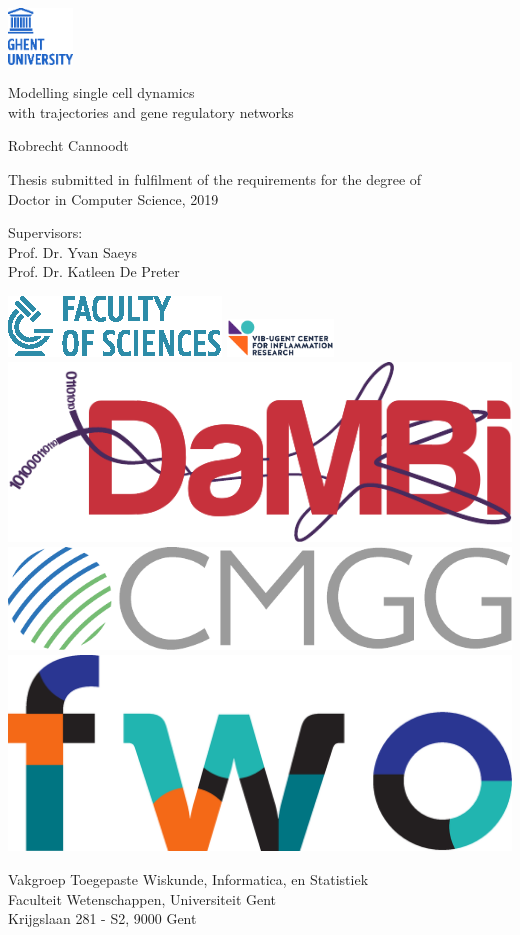 
\begin{titlepage}
	
	\includegraphics[height=1.5cm]{fig/logos/logo_UGent_EN_RGB_color}
	
	\centering
	
	\vfill
	{\Huge \textsf{Modelling single cell dynamics\\with trajectories and gene regulatory networks}}
	
	\vspace{2.25cm}
	
	{\LARGE \textsf{Robrecht Cannoodt}}
	
	\vspace{2.25cm}
	
	{\textsf{Thesis submitted in fulfilment of the requirements for the degree of \\Doctor in Computer Science, 2019}}
	
	\vfill
	
	{\textsf{Supervisors: \\
			Prof. Dr. Yvan Saeys\\Prof. Dr. Katleen De Preter}}
	
	\vfill
	
	\includegraphics[height=.7cm]{fig/logos/icon_UGent_WE_EN_RGB_color}\hfill
	\includegraphics[height=1cm]{fig/logos/vib_rf_inflammation_research_rgb_pos} \hfill
	\includegraphics[height=.8cm]{fig/logos/dambi_logo} \hfill
	\includegraphics[height=.7cm]{fig/logos/cmgg_myshort} \hfill
	\includegraphics[height=.7cm]{fig/logos/FWO_Logo_KleurCMYK} 
	\vspace{1cm}
	
	{\textsf{Vakgroep Toegepaste Wiskunde, Informatica, en Statistiek\\
			Faculteit Wetenschappen, Universiteit Gent \\
			Krijgslaan 281 - S2, 9000 Gent}}
		
\end{titlepage}

